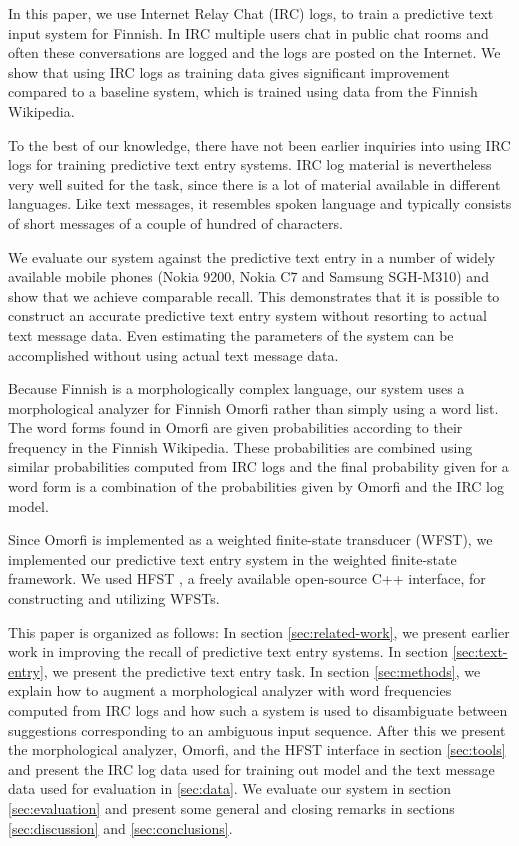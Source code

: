\documentclass[a4paper,conference]{IEEEtran}
\begin{document}
In this paper, we use Internet Relay Chat (IRC) logs, to train a
predictive text input system for Finnish. In IRC multiple users chat
in public chat rooms and often these conversations are logged and the
logs are posted on the Internet. We show that using IRC logs as
training data gives significant improvement compared to a baseline
system, which is trained using data from the Finnish Wikipedia.

To the best of our knowledge, there have not been earlier inquiries
into using IRC logs for training predictive text entry systems. IRC
log material is nevertheless very well suited for the task, since
there is a lot of material available in different languages. Like text
messages, it resembles spoken language and typically consists of short
messages of a couple of hundred of characters.

We evaluate our system against the predictive text entry in a number
of widely available mobile phones (Nokia 9200, Nokia C7 and Samsung
SGH-M310) and show that we achieve comparable recall. This
demonstrates that it is possible to construct an accurate predictive
text entry system without resorting to actual text message data. Even
estimating the parameters of the system can be accomplished without
using actual text message data.

Because Finnish is a morphologically complex language, our system uses
a morphological analyzer for Finnish Omorfi
\cite{pirinen/2011/nodalida} rather than simply using a word list. The
word forms found in Omorfi are given probabilities according to their
frequency in the Finnish Wikipedia. These probabilities are combined
using similar probabilities computed from IRC logs and the final
probability given for a word form is a combination of the
probabilities given by Omorfi and the IRC log model.

Since Omorfi is implemented as a weighted finite-state transducer
(WFST), we implemented our predictive text entry system in the
weighted finite-state framework. We used HFST
\cite{conf/sfcm/Linden2009}, a freely available open-source C++
interface, for constructing and utilizing WFSTs.

This paper is organized as follows: In section \ref{sec:related-work},
we present earlier work in improving the recall of predictive text
entry systems. In section \ref{sec:text-entry}, we present the predictive
text entry task. In section \ref{sec:methods}, we explain how to
augment a morphological analyzer with word frequencies computed from
IRC logs and how such a system is used to disambiguate between
suggestions corresponding to an ambiguous input sequence. After this
we present the morphological analyzer, Omorfi, and the HFST interface
in section \ref{sec:tools} and present the IRC log data used for
training out model and the text message data used for evaluation in
\ref{sec:data}. We evaluate our system in section \ref{sec:evaluation}
and present some general and closing remarks in sections
\ref{sec:discussion} and \ref{sec:conclusions}.
\end{document}
